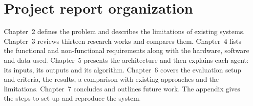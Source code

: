 \section{Project report organization}
Chapter~2 defines the problem and describes the limitations of existing systems. Chapter~3 reviews thirteen research works and compares them. Chapter~4 lists the functional and non-functional requirements along with the hardware, software and data used. Chapter~5 presents the architecture and then explains each agent: its inputs, its outputs and its algorithm. Chapter~6 covers the evaluation setup and criteria, the results, a comparison with existing approaches and the limitations. Chapter~7 concludes and outlines future work. The appendix gives the steps to set up and reproduce the system.
